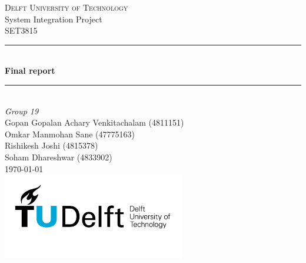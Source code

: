 \documentclass[a4paper]{article}
\begin{document}

\begin{titlepage}

\newcommand{\HRule}{\rule{\linewidth}{0.5mm}} 							%
\center 
 
\textsc{\LARGE Delft University of Technology}\\[1cm]

\Large{System Integration Project}\\[0.2cm]
\textsc{\large SET3815}\\[1cm] 										%
\HRule \\[0.8cm]
{ \huge \bfseries Final report}\\[0.7cm]								%

\HRule \\[2cm]
\large
\emph{\LARGE{Group 19}}\\
Gopan Gopalan Achary Venkitachalam (4811151) \\
 Omkar Manmohan Sane (47775163)\\Rishikesh Joshi (4815378)\\
Soham Dhareshwar (4833902)\\[1.5cm]
 
{\large \today}\\[5cm]
\includegraphics[width=0.6\textwidth]{TU_delft_logo.jpg}\\[1cm] 
\vfill 
\end{titlepage}



%


\appendix
%
\newpage


\end{document}
